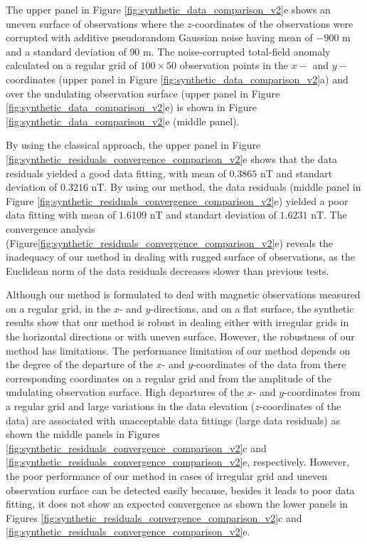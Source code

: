 
The upper panel in Figure \ref{fig:synthetic_data_comparison_v2}e shows an uneven surface of observations where  the $z$-coordinates of the observations were corrupted with additive pseudorandom Gaussian noise having mean of  $- 900$ m  and a standard deviation of $90$ m.
The noise-corrupted total-field anomaly calculated on a regular grid  of $100 \times 50$ observation points in the $x-$ and $y-$coordinates (upper panel in Figure  \ref{fig:synthetic_data_comparison_v2}a) and
over the undulating observation surface (upper panel in Figure \ref{fig:synthetic_data_comparison_v2}e)
is shown in Figure \ref{fig:synthetic_data_comparison_v2}e (middle panel).

By using the classical approach, the upper panel in 
Figure \ref{fig:synthetic_residuals_convergence_comparison_v2}e shows that the data residuals 
yielded a good data fitting, with  mean of $0.3865$ nT and standart deviation of $0.3216$ nT. 
By using our method,  the data residuals (middle panel in 
Figure \ref{fig:synthetic_residuals_convergence_comparison_v2}e) yielded a poor data  fitting with mean of $1.6109$ nT and standart deviation of $1.6231$ nT.
The convergence analysis (Figure\ref{fig:synthetic_residuals_convergence_comparison_v2}e)
reveals the inadequacy of our method in dealing with rugged  surface of observations, as 
the Euclidean norm of the data residuals decreases slower than previous tests. 

Although our method is formulated to deal with magnetic observations measured on a regular grid, in 
the $x$- and $y$-directions, and on a flat surface, the synthetic results show that our method is 
robust in dealing either with irregular grids in the horizontal directions or with uneven surface.
However, the robustness of our method has limitations.
The performance limitation of our method depends on the degree of the 
departure of the $x$- and $y$-coordinates of the data from there corresponding coordinates on a regular grid
and from the amplitude of the undulating observation surface.
High departures of the $x$- and $y$-coordinates  from a regular grid and large variations in the data elevation ($z$-coordinates of the data) are associated with unacceptable data fittings (large data residuals) as shown the middle panels in Figures \ref{fig:synthetic_residuals_convergence_comparison_v2}c and \ref{fig:synthetic_residuals_convergence_comparison_v2}e, respectively.
However, the poor performance of our method in cases of irregular grid and uneven observation surface can be detected easily because, besides it leads to poor data fitting, it does not show an expected convergence as shown the lower panels in Figures \ref{fig:synthetic_residuals_convergence_comparison_v2}c  and \ref{fig:synthetic_residuals_convergence_comparison_v2}e.

